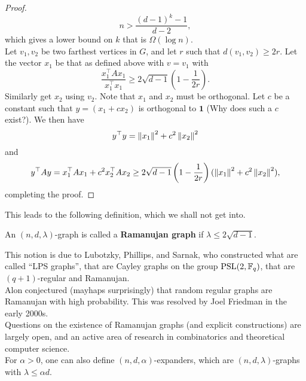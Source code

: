 \begin{proof}
				\[ n > \frac{(d-1)^k - 1}{d-2}, \]
				which gives a lower bound on $k$ that is $\Omega(\log n)$.\\
				Let $v_1,v_2$ be two farthest vertices in $G$, and let $r$ such that $d(v_1,v_2) \ge 2r$. Let the vector $x_1$ be that as defined above with $v=v_1$ with
				\[ \frac{x_1^\top A x_1}{x_1^\top x_1} \ge 2\sqrt{d-1} \left( 1 - \frac{1}{2r} \right). \]
				Similarly get $x_2$ using $v_2$. Note that $x_1$ and $x_2$ must be orthogonal. Let $c$ be a constant such that $y = (x_1 + c x_2)$ is orthogonal to $\mathbf{1}$ (Why does such a $c$ exist?). We then have
				\[ y^\top y = \left\lVert x_1\right\rVert^2 + c^2\left\lVert x_2\right\rVert^2 \]
				and
				\[ y^\top A y = x_1^\top A x_1 + c^2 x_2^\top A x_2 \ge 2\sqrt{d-1} \left( 1 - \frac{1}{2r} \right) (\left\lVert x_1\right\rVert^2 + c^2\left\lVert x_2\right\rVert^2), \]
				completing the proof.
			\end{proof}

			This leads to the following definition, which we shall not get into.

			\begin{fdef}
				An $(n,d,\lambda)$-graph is called a \textbf{Ramanujan graph} if $\lambda\le 2\sqrt{d-1}$.
			\end{fdef}

			This notion is due to Lubotzky, Phillips, and Sarnak, who constructed what are called ``LPS graphs'', that are Cayley graphs on the group $\operatorname{PSL}(2,\mathbb{F}_q)$, that are $(q+1)$-regular and Ramanujan.\\

			Alon conjectured (mayhaps surprisingly) that random regular graphs are Ramanujan with high probability. This was resolved by Joel Friedman in the early 2000s.\\
			Questions on the existence of Ramanujan graphs (and explicit constructions) are largely open, and an active area of research in combinatorics and theoretical computer science.\\
 			For $\alpha > 0$, one can also define $(n,d,\alpha)$-expanders, which are $(n,d,\lambda)$-graphs with $\lambda\le\alpha d$.\\
			
\clearpage